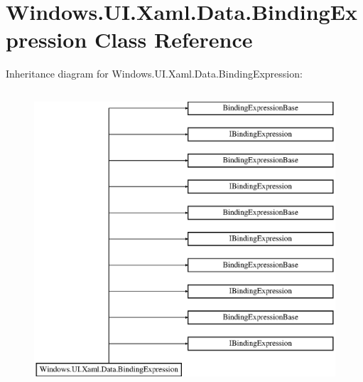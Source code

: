 \hypertarget{class_windows_1_1_u_i_1_1_xaml_1_1_data_1_1_binding_expression}{}\section{Windows.\+U\+I.\+Xaml.\+Data.\+Binding\+Expression Class Reference}
\label{class_windows_1_1_u_i_1_1_xaml_1_1_data_1_1_binding_expression}
Inheritance diagram for Windows.\+U\+I.\+Xaml.\+Data.\+Binding\+Expression\+:\begin{figure}[H]
\begin{center}
\leavevmode
\includegraphics[height=11.000000cm]{class_windows_1_1_u_i_1_1_xaml_1_1_data_1_1_binding_expression}
\end{center}
\end{figure}
